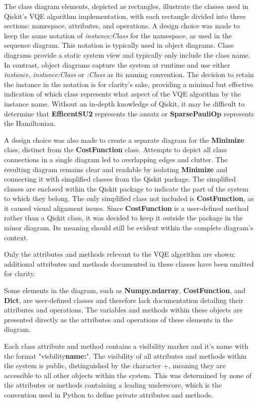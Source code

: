 \documentclass{article}
\begin{document}
The class diagram elements, depicted as rectangles, illustrate the classes used in Qiskit’s VQE algorithm implementation, with each rectangle divided into three sections: namespace, attributes, and operations. A design choice was made to keep the same notation of \textit{instance:Class} for the namespace, as used in the sequence diagram. This notation is typically used in object diagrams. Class diagrams provide a static system view and typically only include the class name. In contrast, object diagrams capture the system at runtime and use either \textit{instance}, \textit{instance:Class} or \textit{:Class} as its naming convention\cite{Seidl_Scholz_Huemer_Kappel_Duffy_2014}. The decision to retain the instance in the notation is for clarity's sake, providing a minimal but effective indication of which class represents what aspect of the VQE algorithm by the instance name. Without an in-depth knowledge of Qiskit, it may be difficult to determine that \textbf{EfficentSU2} represents the ansatz or \textbf{SparsePauliOp} represents the Hamiltonian.

A design choice was also made to create a separate diagram for the \textbf{Minimize} class, distinct from the \textbf{CostFunction} class. Attempts to depict all class connections in a single diagram led to overlapping edges and clutter. The resulting diagram remains clear and readable by isolating \textbf{Minimize} and connecting it with simplified classes from the Qiskit package. The simplified classes are enclosed within the Qiskit package to indicate the part of the system to which they belong. The only simplified class not included is \textbf{CostFunction}, as it caused visual alignment issues. Since \textbf{CostFunction} is a user-defined method rather than a Qiskit class, it was decided to keep it outside the package in the minor diagram. Its meaning should still be evident within the complete diagram's context.

Only the attributes and methods relevant to the VQE algorithm are shown; additional attributes and methods documented in these classes have been omitted for clarity.

Some elements in the diagram, such as \textbf{Numpy.ndarray}, \textbf{CostFunction}, and \textbf{Dict}, are user-defined classes and therefore lack documentation detailing their attributes and operations. The variables and methods within these objects are presented directly as the attributes and operations of these elements in the diagram.

Each class attribute and method contains a visibility marker and it's name with the format "visbility\textbf{name:}". The visibility of all attributes and methods within the system is public, distinguished by the character +, meaning they are accessible to all other objects within the system\cite{Seidl_Scholz_Huemer_Kappel_Duffy_2014}. This was determined by none of the attributes or methods containing a leading underscore, which is the convention used in Python to define private attributes and methods\cite{Privacy}.
\end{document}
